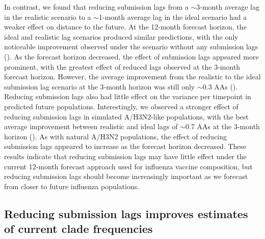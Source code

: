 \documentclass[9pt,lineno]{elife}
\begin{document}
\begin{table}[htb]
  \begin{center}
    
    \caption{Distance to the future in amino acids (mean +/- standard deviation AAs) by forecast horizon (in months) and submission lag for A/H3N2 populations.}
    \label{tab:h3n2_distances_to_the_future}
  \end{center}
\end{table}

In contrast, we found that reducing submission lags from a $\sim$3-month average lag in the realistic scenario to a $\sim$1-month average lag in the ideal scenario had a weaker effect on distance to the future.
At the 12-month forecast horizon, the ideal and realistic lag scenarios produced similar predictions, with the only noticeable improvement observed under the scenario without any submission lags ().
As the forecast horizon decreased, the effect of submission lags appeared more prominent, with the greatest effect of reduced lags observed at the 3-month forecast horizon.
However, the average improvement from the realistic to the ideal submission lag scenario at the 3-month horizon was still only $\sim$0.3 AAs ().
Reducing submission lags also had little effect on the variance per timepoint in predicted future populations.
Interestingly, we observed a stronger effect of reducing submission lags in simulated A/H3N2-like populations, with the best average improvement between realistic and ideal lags of $\sim$0.7 AAs at the 3-month horizon ().
As with natural A/H3N2 populations, the effect of reducing submission lags appeared to increase as the forecast horizon decreased.
These results indicate that reducing submission lags may have little effect under the current 12-month forecast approach used for influenza vaccine composition, but reducing submission lags should become increasingly important as we forecast from closer to future influenza populations.

\subsection{Reducing submission lags improves estimates of current clade frequencies}
\end{document}
